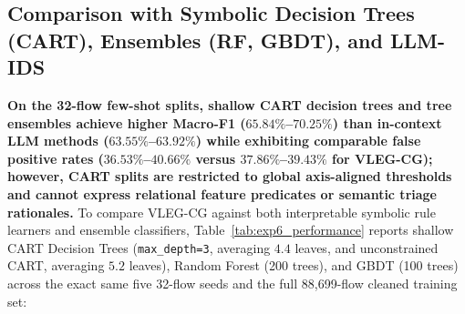 \documentclass[10pt,a4paper,onecolumn]{article}
\theoremstyle{definition}
\theoremstyle{remark}
\begin{document}
\subsection{Comparison with Symbolic Decision Trees (CART), Ensembles (RF, GBDT), and LLM-IDS}
\label{sec:exp7}
\textbf{On the 32-flow few-shot splits, shallow CART decision trees and tree ensembles achieve higher Macro-F1 ($65.84\%$--$70.25\%$) than in-context LLM methods ($63.55\%$--$63.92\%$) while exhibiting comparable false positive rates ($36.53\%$--$40.66\%$ versus $37.86\%$--$39.43\%$ for VLEG-CG); however, CART splits are restricted to global axis-aligned thresholds and cannot express relational feature predicates or semantic triage rationales.} To compare VLEG-CG against both interpretable symbolic rule learners and ensemble classifiers, Table~\ref{tab:exp6_performance} reports shallow CART Decision Trees (\texttt{max\_depth=3}, averaging $4.4$ leaves, and unconstrained CART, averaging $5.2$ leaves), Random Forest (200 trees), and GBDT (100 trees) across the exact same five 32-flow seeds and the full 88,699-flow cleaned training set:
\end{document}
